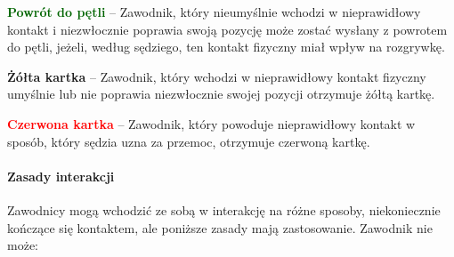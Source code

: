\documentclass[12pt]{article}
\newcommand\redcard[1]{\bgroup\textcolor{red}{\textbf{#1}}}
\newcommand\yellowcard[1]{\bgroup\textcolor{darkyellow}{\textbf{#1}}}
\newcommand\other[1]{\bgroup\textcolor{darkgreen}{\textbf{#1}}}
\begin{document}
\other{Powrót do pętli} -- Zawodnik, który nieumyślnie wchodzi w
nieprawidłowy kontakt i niezwłocznie poprawia swoją pozycję może zostać
wysłany z powrotem do pętli, jeżeli, według sędziego, ten kontakt
fizyczny miał wpływ na rozgrywkę.

\yellowcard{Żółta kartka} -- Zawodnik, który wchodzi w nieprawidłowy kontakt
fizyczny umyślnie lub nie poprawia niezwłocznie swojej pozycji otrzymuje
żółtą kartkę.

\redcard{Czerwona kartka} -- Zawodnik, który powoduje nieprawidłowy kontakt
w sposób, który sędzia uzna za przemoc, otrzymuje czerwoną kartkę.

\paragraph{Zasady interakcji}
Zawodnicy mogą wchodzić ze sobą w
interakcję na różne sposoby, niekoniecznie kończące się kontaktem, ale
poniższe zasady mają zastosowanie. Zawodnik nie może:
\end{document}
